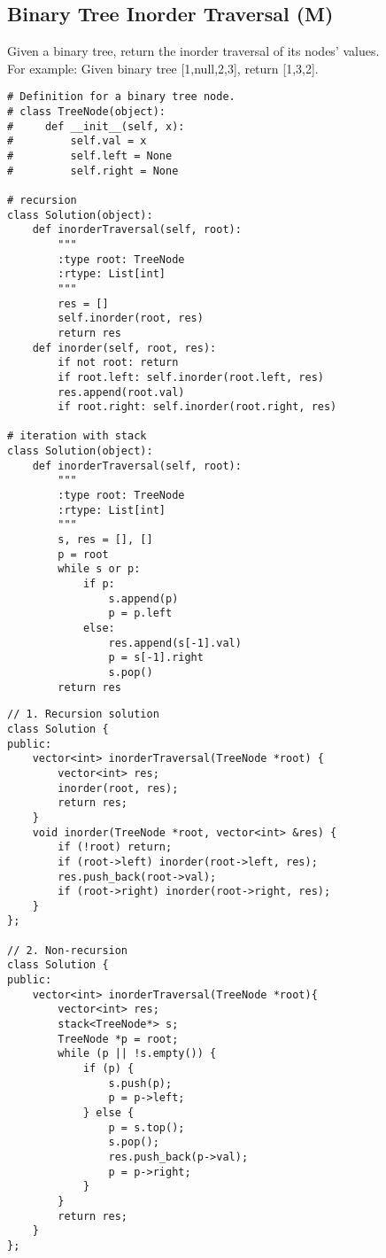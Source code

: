 \subsection{Binary Tree Inorder Traversal (M)}
Given a binary tree, return the inorder traversal of its nodes' values. \\

For example: Given binary tree [1,null,2,3], return [1,3,2]. \\

\begin{lstlisting}
# Definition for a binary tree node.
# class TreeNode(object):
#     def __init__(self, x):
#         self.val = x
#         self.left = None
#         self.right = None

# recursion
class Solution(object):
    def inorderTraversal(self, root):
        """
        :type root: TreeNode
        :rtype: List[int]
        """
        res = []
        self.inorder(root, res)
        return res
    def inorder(self, root, res):
        if not root: return
        if root.left: self.inorder(root.left, res)
        res.append(root.val)
        if root.right: self.inorder(root.right, res)

# iteration with stack
class Solution(object):
    def inorderTraversal(self, root):
        """
        :type root: TreeNode
        :rtype: List[int]
        """
        s, res = [], []
        p = root
        while s or p:
            if p:
                s.append(p)
                p = p.left
            else:
                res.append(s[-1].val)
                p = s[-1].right
                s.pop()
        return res
\end{lstlisting}

\begin{lstlisting}
// 1. Recursion solution
class Solution {
public:
    vector<int> inorderTraversal(TreeNode *root) {
        vector<int> res;
        inorder(root, res);
        return res;
    }
    void inorder(TreeNode *root, vector<int> &res) {
        if (!root) return;
        if (root->left) inorder(root->left, res);
        res.push_back(root->val);
        if (root->right) inorder(root->right, res);
    }
};

// 2. Non-recursion
class Solution {
public:
    vector<int> inorderTraversal(TreeNode *root){
        vector<int> res;
        stack<TreeNode*> s;
        TreeNode *p = root;
        while (p || !s.empty()) {
            if (p) {
                s.push(p);
                p = p->left;
            } else {
                p = s.top();
                s.pop();
                res.push_back(p->val);
                p = p->right;
            }
        }
        return res;
    }
};
\end{lstlisting}


